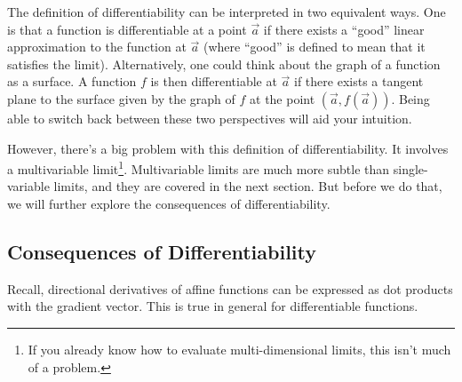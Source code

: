 The definition of differentiability can be interpreted in two equivalent
ways.  One is that a function is differentiable at a point $\vec a$ if there exists a ``good''
linear approximation to the function at $\vec a$ (where ``good'' is defined
to mean that it satisfies the limit).  Alternatively, one could think
about the graph of a function as a surface.  A function $f$ is then differentiable
at $\vec a$ if there exists a tangent plane to the surface given by the graph
of $f$ at the point $(\vec a, f(\vec a))$.  Being able to switch back between these
two perspectives will aid your intuition.

However, there's a big problem with this definition of differentiability.  It
involves a multivariable limit\footnote{ If you already know how to evaluate
multi-dimensional limits, this isn't much of a problem.}.  Multivariable limits
are much more subtle than single-variable limits, and they are covered in the next
section.  But before we do that, we will further explore the consequences of 
differentiability.

\subsection{Consequences of Differentiability}

Recall, directional derivatives of affine functions can be expressed
as dot products with the gradient vector.  This is true in general
for differentiable functions.

